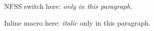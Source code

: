 NFSS switch here: \itshape only in this paragraph.

Inline macro here: \textit{italic} only in this paragraph.

